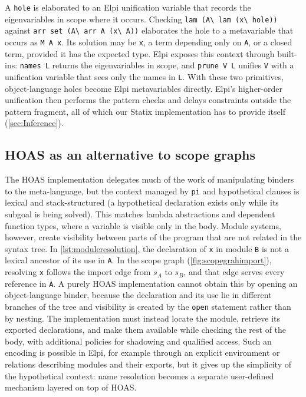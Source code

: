 A \lstinline|hole| is elaborated to an Elpi unification variable that records
the eigenvariables in scope where it occurs. Checking
\lstinline|lam (A\ lam (x\ hole))| against
\lstinline|arr set (A\ arr A (x\ A))| elaborates the hole to a metavariable that
occurs as \lstinline|M A x|. Its solution may be \lstinline|x|, a term depending
only on \lstinline|A|, or a closed term, provided it has the expected type.
Elpi exposes this context through built-ins: \lstinline|names L| returns the
eigenvariables in scope, and \lstinline|prune V L| unifies \lstinline|V| with a
unification variable that sees only the names in \lstinline|L|. With these two
primitives, object-language holes become Elpi metavariables directly. Elpi's
higher-order unification then performs the pattern checks and delays
constraints outside the pattern fragment, all of which our Statix
implementation has to provide itself (\cref{sec:Inference}).

\subsection{HOAS as an alternative to scope graphs}

The HOAS implementation delegates much of the work of manipulating binders to
the meta-language, but the context managed by \lstinline|pi| and hypothetical
clauses is lexical and stack-structured (a hypothetical declaration exists only
while its subgoal is being solved). This matches lambda abstractions and
dependent function types, where a variable is visible only in the body. Module
systems, however, create visibility between parts of the program that are not
related in the syntax tree. In \cref{lst:moduleresolution}, the declaration of
\lstinline|x| in module \lstinline|B| is not a lexical ancestor of its use in
\lstinline|A|. In the scope graph (\cref{fig:scopegrahimport}), resolving
\lstinline|x| follows the import edge from $s_A$ to $s_B$, and that edge serves
every reference in \lstinline|A|. A purely HOAS implementation cannot obtain
this by opening an object-language binder, because the declaration and its use
lie in different branches of the tree and visibility is created by the
\lstinline|open| statement rather than by nesting. The implementation must
instead locate the module, retrieve its exported declarations, and make them
available while checking the rest of the body, with additional policies for
shadowing and qualified access. Such an encoding is possible in Elpi, for
example through an explicit environment or relations describing modules and
their exports, but it gives up the simplicity of the hypothetical context: name
resolution becomes a separate user-defined mechanism layered on top of HOAS.
